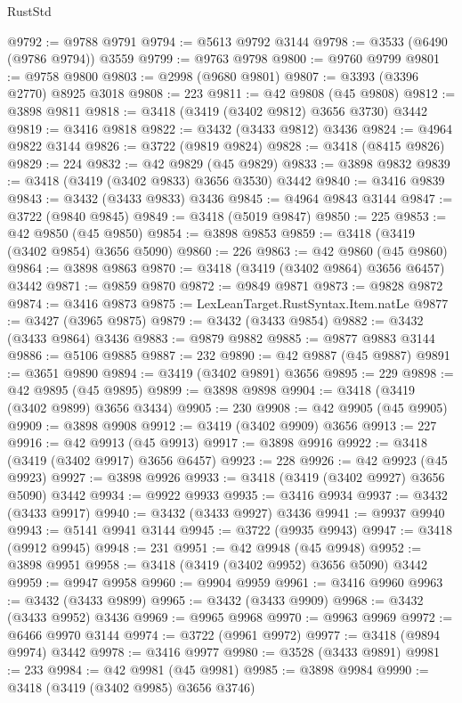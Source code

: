 \begin{lexlean}{RustStd}
\begin{coremodule}
@9792 := @9788 @9791
@9794 := @5613 @9792 @3144
@9798 := @3533 (@6490 (@9786 @9794)) @3559
@9799 := @9763 @9798
@9800 := @9760 @9799
@9801 := @9758 @9800
@9803 := @2998 (@9680 @9801)
@9807 := @3393 (@3396 @2770) @8925 @3018
@9808 := 223
@9811 := @42 @9808 (@45 @9808)
@9812 := @3898 @9811
@9818 := @3418 (@3419 (@3402 @9812) @3656 @3730) @3442
@9819 := @3416 @9818
@9822 := @3432 (@3433 @9812) @3436
@9824 := @4964 @9822 @3144
@9826 := @3722 (@9819 @9824)
@9828 := @3418 (@8415 @9826)
@9829 := 224
@9832 := @42 @9829 (@45 @9829)
@9833 := @3898 @9832
@9839 := @3418 (@3419 (@3402 @9833) @3656 @3530) @3442
@9840 := @3416 @9839
@9843 := @3432 (@3433 @9833) @3436
@9845 := @4964 @9843 @3144
@9847 := @3722 (@9840 @9845)
@9849 := @3418 (@5019 @9847)
@9850 := 225
@9853 := @42 @9850 (@45 @9850)
@9854 := @3898 @9853
@9859 := @3418 (@3419 (@3402 @9854) @3656 @5090)
@9860 := 226
@9863 := @42 @9860 (@45 @9860)
@9864 := @3898 @9863
@9870 := @3418 (@3419 (@3402 @9864) @3656 @6457) @3442
@9871 := @9859 @9870
@9872 := @9849 @9871
@9873 := @9828 @9872
@9874 := @3416 @9873
@9875 := LexLeanTarget.RustSyntax.Item.natLe
@9877 := @3427 (@3965 @9875)
@9879 := @3432 (@3433 @9854)
@9882 := @3432 (@3433 @9864) @3436
@9883 := @9879 @9882
@9885 := @9877 @9883 @3144
@9886 := @5106 @9885
@9887 := 232
@9890 := @42 @9887 (@45 @9887)
@9891 := @3651 @9890
@9894 := @3419 (@3402 @9891) @3656
@9895 := 229
@9898 := @42 @9895 (@45 @9895)
@9899 := @3898 @9898
@9904 := @3418 (@3419 (@3402 @9899) @3656 @3434)
@9905 := 230
@9908 := @42 @9905 (@45 @9905)
@9909 := @3898 @9908
@9912 := @3419 (@3402 @9909) @3656
@9913 := 227
@9916 := @42 @9913 (@45 @9913)
@9917 := @3898 @9916
@9922 := @3418 (@3419 (@3402 @9917) @3656 @6457)
@9923 := 228
@9926 := @42 @9923 (@45 @9923)
@9927 := @3898 @9926
@9933 := @3418 (@3419 (@3402 @9927) @3656 @5090) @3442
@9934 := @9922 @9933
@9935 := @3416 @9934
@9937 := @3432 (@3433 @9917)
@9940 := @3432 (@3433 @9927) @3436
@9941 := @9937 @9940
@9943 := @5141 @9941 @3144
@9945 := @3722 (@9935 @9943)
@9947 := @3418 (@9912 @9945)
@9948 := 231
@9951 := @42 @9948 (@45 @9948)
@9952 := @3898 @9951
@9958 := @3418 (@3419 (@3402 @9952) @3656 @5090) @3442
@9959 := @9947 @9958
@9960 := @9904 @9959
@9961 := @3416 @9960
@9963 := @3432 (@3433 @9899)
@9965 := @3432 (@3433 @9909)
@9968 := @3432 (@3433 @9952) @3436
@9969 := @9965 @9968
@9970 := @9963 @9969
@9972 := @6466 @9970 @3144
@9974 := @3722 (@9961 @9972)
@9977 := @3418 (@9894 @9974) @3442
@9978 := @3416 @9977
@9980 := @3528 (@3433 @9891)
@9981 := 233
@9984 := @42 @9981 (@45 @9981)
@9985 := @3898 @9984
@9990 := @3418 (@3419 (@3402 @9985) @3656 @3746)

\end{coremodule}
\end{lexlean}
